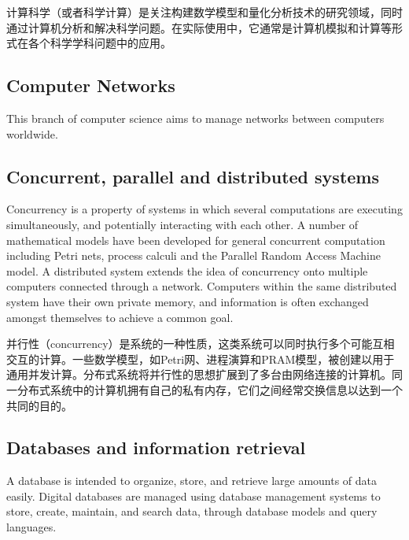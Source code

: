 计算科学（或者科学计算）是关注构建数学模型和量化分析技术的研究领域，同时通过计算机分析和解决科学问题。在实际使用中，它通常是计算机模拟和计算等形式在各个科学学科问题中的应用。





\subsection{Computer Networks}


This branch of computer science aims to manage networks between computers worldwide.







\subsection{Concurrent, parallel and distributed systems}

Concurrency is a property of systems in which several computations are executing simultaneously, and potentially interacting with each other. A number of mathematical models have been developed for general concurrent computation including Petri nets, process calculi and the Parallel Random Access Machine model. A distributed system extends the idea of concurrency onto multiple computers connected through a network. Computers within the same distributed system have their own private memory, and information is often exchanged amongst themselves to achieve a common goal.

并行性（concurrency）是系统的一种性质，这类系统可以同时执行多个可能互相交互的计算。一些数学模型，如Petri网、进程演算和PRAM模型，被创建以用于通用并发计算。分布式系统将并行性的思想扩展到了多台由网络连接的计算机。同一分布式系统中的计算机拥有自己的私有内存，它们之间经常交换信息以达到一个共同的目的。





\subsection{Databases and information retrieval}


A database is intended to organize, store, and retrieve large amounts of data easily. Digital databases are managed using database management systems to store, create, maintain, and search data, through database models and query languages.


